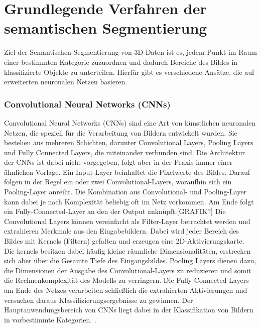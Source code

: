 \chapter{Grundlegende Verfahren der semantischen Segmentierung}

Ziel der Semantischen Segmentierung von 3D-Daten ist es, jedem Punkt im Raum
einer bestimmten Kategorie zuzuordnen und dadurch Bereiche des Bildes in
klassifizierte Objekte zu unterteilen. Hierfür gibt es verschiedene Ansätze,
die auf erweiterten neuronalen Netzen basieren.

\subsection{Convolutional Neural Networks (CNNs)}
Convolutional Neural Networks (CNNs) sind eine Art von künstlichen neuronalen
Netzen, die speziell für die Verarbeitung von Bildern entwickelt wurden. Sie
bestehen aus mehreren Schichten, darunter Convolutional Layers, Pooling Layers
und Fully Connected Layers, die miteinander verbunden sind. Die Architektur der
CNNs ist dabei nicht vorgegeben, folgt aber in der Praxis immer einer ähnlichen
Vorlage. Ein Input-Layer beinhaltet die Pixelwerte des Bildes. Darauf folgen in
der Regel ein oder zwei Convolutional-Layers, woraufhin sich ein Pooling-Layer
anreiht. Die Kombination aus Convolutional- und Pooling-Layer kann dabei je
nach Komplexität beliebig oft im Netz vorkommen. Am Ende folgt ein
Fully-Connected-Layer an den der Output anknüpft.[GRAFIK?] Die Convolutional
Layers können vereinfacht als Filter-Layer betrachtet werden und extrahieren
Merkmale aus den Eingabebildern. Dabei wird jeder Bereich des Bildes mit
Kernels (Filtern) gefalten und erzeugen eine 2D-Aktivierungskarte. Die kernels
besitzen dabei häufig kleine räumliche Dimensionalitäten, erstrecken sich aber
über die Gesamte Tiefe des Eingangsbildes. Pooling Layers dienen dazu, die
Dimensionen der Ausgabe des Convolutional-Layers zu reduzieren und somit die
Rechnenkomplexität des Modells zu verringern. Die Fully Connected Layers am
Ende des Netzes verarbeiten schließlich die extrahierten Aktivierungen und
versuchen daraus Klassifizierungsergebnisse zu gewinnen. Der
Hauptanwendungsbereich von CNNs liegt dabei in der Klassifikation von Bildern
in vorbestimmte Kategorien. \cite{OShea.11262015}.

